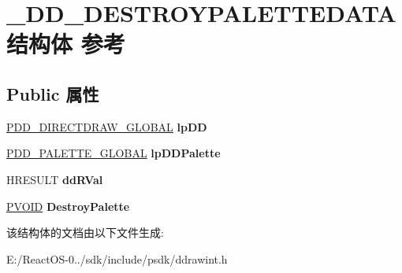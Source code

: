 \hypertarget{struct___d_d___d_e_s_t_r_o_y_p_a_l_e_t_t_e_d_a_t_a}{}\section{\+\_\+\+D\+D\+\_\+\+D\+E\+S\+T\+R\+O\+Y\+P\+A\+L\+E\+T\+T\+E\+D\+A\+T\+A结构体 参考}
\label{struct___d_d___d_e_s_t_r_o_y_p_a_l_e_t_t_e_d_a_t_a}
\subsection*{Public 属性}
\begin{DoxyCompactItemize}
\item 
\mbox{\label{struct___d_d___d_e_s_t_r_o_y_p_a_l_e_t_t_e_d_a_t_a_aa1165ef104a35042f03a6b0827df586b}} 
\hyperlink{struct___d_d___d_i_r_e_c_t_d_r_a_w___g_l_o_b_a_l}{P\+D\+D\+\_\+\+D\+I\+R\+E\+C\+T\+D\+R\+A\+W\+\_\+\+G\+L\+O\+B\+AL} {\bfseries lp\+DD}
\item 
\mbox{\label{struct___d_d___d_e_s_t_r_o_y_p_a_l_e_t_t_e_d_a_t_a_ada2f1febf21069c08a26520a34f980fa}} 
\hyperlink{struct___d_d___p_a_l_e_t_t_e___g_l_o_b_a_l}{P\+D\+D\+\_\+\+P\+A\+L\+E\+T\+T\+E\+\_\+\+G\+L\+O\+B\+AL} {\bfseries lp\+D\+D\+Palette}
\item 
\mbox{\label{struct___d_d___d_e_s_t_r_o_y_p_a_l_e_t_t_e_d_a_t_a_a14c40f954b4c11d8b2b514a310ae63f7}} 
H\+R\+E\+S\+U\+LT {\bfseries dd\+R\+Val}
\item 
\mbox{\label{struct___d_d___d_e_s_t_r_o_y_p_a_l_e_t_t_e_d_a_t_a_ac03c2414beaa090f9cb94d682a2fb030}} 
\hyperlink{interfacevoid}{P\+V\+O\+ID} {\bfseries Destroy\+Palette}
\end{DoxyCompactItemize}


该结构体的文档由以下文件生成\+:\begin{DoxyCompactItemize}
\item 
E\+:/\+React\+O\+S-\/0../sdk/include/psdk/ddrawint.\+h\end{DoxyCompactItemize}
